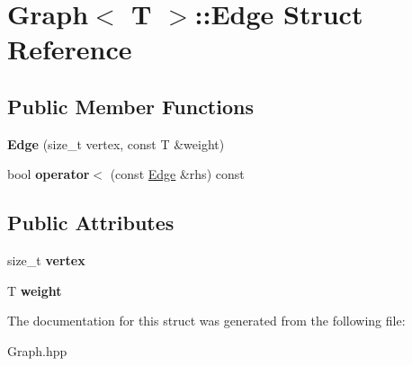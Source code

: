 \hypertarget{struct_graph_1_1_edge}{}\section{Graph$<$ T $>$\+:\+:Edge Struct Reference}
\label{struct_graph_1_1_edge}
\subsection*{Public Member Functions}
\begin{DoxyCompactItemize}
\item 
\mbox{\label{struct_graph_1_1_edge_afd276053e431d2667e8fbd49a4d475ab}} 
{\bfseries Edge} (size\+\_\+t vertex, const T \&weight)
\item 
\mbox{\label{struct_graph_1_1_edge_afd6e81d4470450049b741a76709d9007}} 
bool {\bfseries operator$<$} (const \hyperlink{struct_graph_1_1_edge}{Edge} \&rhs) const
\end{DoxyCompactItemize}
\subsection*{Public Attributes}
\begin{DoxyCompactItemize}
\item 
\mbox{\label{struct_graph_1_1_edge_a39217ae89af4abf08f840b29770f72a7}} 
size\+\_\+t {\bfseries vertex}
\item 
\mbox{\label{struct_graph_1_1_edge_a66e0b956af51308dd1da103872e01c93}} 
T {\bfseries weight}
\end{DoxyCompactItemize}


The documentation for this struct was generated from the following file\+:\begin{DoxyCompactItemize}
\item 
Graph.\+hpp\end{DoxyCompactItemize}
